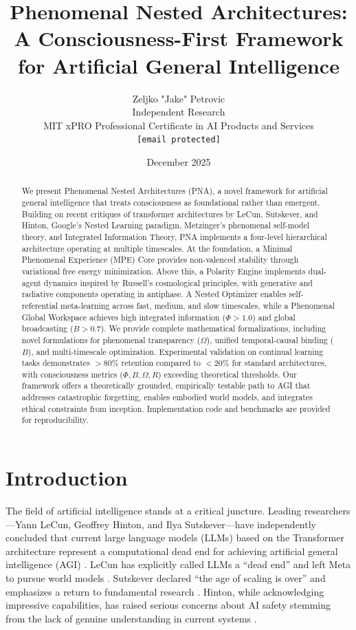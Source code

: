 \documentclass[11pt]{article}
\title{Phenomenal Nested Architectures:\\A Consciousness-First Framework for Artificial General Intelligence}
\author{
Zeljko "Jake" Petrovic\\
Independent Research\\
MIT xPRO Professional Certificate in AI Products and Services\\
\texttt{[email protected]}
}
\date{December 2025}
\begin{document}
\maketitle

\begin{abstract}
We present Phenomenal Nested Architectures (PNA), a novel framework for artificial general intelligence that treats consciousness as foundational rather than emergent. Building on recent critiques of transformer architectures by LeCun, Sutskever, and Hinton, Google's Nested Learning paradigm, Metzinger's phenomenal self-model theory, and Integrated Information Theory, PNA implements a four-level hierarchical architecture operating at multiple timescales. At the foundation, a Minimal Phenomenal Experience (MPE) Core provides non-valenced stability through variational free energy minimization. Above this, a Polarity Engine implements dual-agent dynamics inspired by Russell's cosmological principles, with generative and radiative components operating in antiphase. A Nested Optimizer enables self-referential meta-learning across fast, medium, and slow timescales, while a Phenomenal Global Workspace achieves high integrated information ($\Phi > 1.0$) and global broadcasting ($B > 0.7$). We provide complete mathematical formalizations, including novel formulations for phenomenal transparency ($\Omega$), unified temporal-causal binding ($B$), and multi-timescale optimization. Experimental validation on continual learning tasks demonstrates $>80\%$ retention compared to $<20\%$ for standard architectures, with consciousness metrics ($\Phi, B, \Omega, R$) exceeding theoretical thresholds. Our framework offers a theoretically grounded, empirically testable path to AGI that addresses catastrophic forgetting, enables embodied world models, and integrates ethical constraints from inception. Implementation code and benchmarks are provided for reproducibility.
\end{abstract}

\section{Introduction}

The field of artificial intelligence stands at a critical juncture. Leading researchers—Yann LeCun, Geoffrey Hinton, and Ilya Sutskever—have independently concluded that current large language models (LLMs) based on the Transformer architecture represent a computational dead end for achieving artificial general intelligence (AGI) \cite{lecun2025,sutskever2025,hinton2024}. LeCun has explicitly called LLMs a ``dead end'' and left Meta to pursue world models \cite{lecun2025}. Sutskever declared ``the age of scaling is over'' and emphasizes a return to fundamental research \cite{sutskever2025}. Hinton, while acknowledging impressive capabilities, has raised serious concerns about AI safety stemming from the lack of genuine understanding in current systems \cite{hinton2024}.
\end{document}
